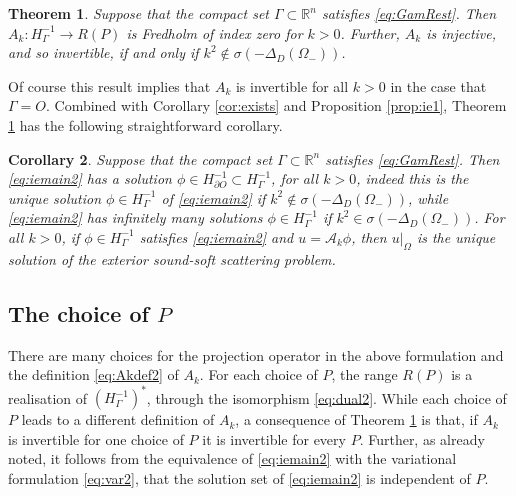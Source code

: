 \documentclass{birkjour}
\newtheorem{theorem}{Theorem}[section]
\newtheorem{corollary}[theorem]{Corollary}
\theoremstyle{definition}
\theoremstyle{remark}
\newtheorem{remark}[theorem]{Remark}
\numberwithin{equation}{section}
\newcommand{\R}{\mathbb{R}}
\newcommand{\cA}{\mathcal{A}}
\begin{document}
\begin{theorem} \label{thm:invert}
Suppose that the compact set $\Gamma\subset \R^n$ satisfies \eqref{eq:GamRest}. Then $A_k:H^{-1}_\Gamma\to  R(P)$ is Fredholm of index zero for $k>0$. Further, $A_k$ is injective, and so invertible, if and only if $k^2\not\in \sigma(-\Delta_D(\Omega_-))$. 
\end{theorem}

Of course this result implies that $A_k$ is invertible for all $k>0$ in the case that $\Gamma=O$. Combined with Corollary \ref{cor:exists} and Proposition \ref{prop:ie1}, Theorem \ref{thm:invert} has the following straightforward corollary.

\begin{corollary} \label{cor:IEfinal}
Suppose that the compact set $\Gamma\subset \R^n$ satisfies \eqref{eq:GamRest}. Then \eqref{eq:iemain2} has a solution $\phi\in H^{-1}_{\partial O} \subset H^{-1}_\Gamma$, for all $k>0$, indeed this is the unique solution $\phi\in H^{-1}_\Gamma$ of \eqref{eq:iemain2} if $k^2\not\in \sigma(-\Delta_D(\Omega_-))$, while \eqref{eq:iemain2} has infinitely many solutions  $\phi\in H^{-1}_\Gamma$ if $k^2\in \sigma(-\Delta_D(\Omega_-))$. For all $k>0$, if  $\phi\in H^{-1}_\Gamma$ satisfies \eqref{eq:iemain2} and $u=\cA_k\phi$, then $u|_\Omega$ is the unique solution of the exterior sound-soft scattering problem.
\end{corollary}



\subsection{The choice of $P$} \label{sec:choice1}
There are many choices for the projection operator in the above formulation and the definition \eqref{eq:Akdef2} of $A_k$. For each  choice of $P$, the range $R(P)$ is a realisation of $(H_\Gamma^{-1})^*$, through the isomorphism \eqref{eq:dual2}.  While each choice of $P$ leads to a different definition of $A_k$, a consequence of Theorem \ref{thm:invert} is that, if $A_k$ is invertible for one choice of $P$ it is invertible for every  $P$. Further, as already noted, it follows from the equivalence of \eqref{eq:iemain2} with the variational formulation \eqref{eq:var2}, %
that the solution set of \eqref{eq:iemain2} is independent of $P$. 
\end{document}
